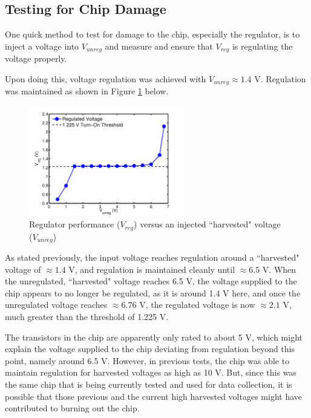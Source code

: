 \documentclass[12pt,onecolumn,titlepage]{article}
\begin{document}
\subsection{Testing for Chip Damage}
\indent \indent One quick method to test for damage to the chip, especially the regulator, is to inject a voltage into $V_{unreg}$ and measure and ensure that $V_{reg}$ is regulating the voltage properly.

Upon doing this, voltage regulation was achieved with $V_{unreg} \approx 1.4$ V. Regulation was maintained as shown in Figure \ref{fig:regulator_damage_test} below.

\begin{figure}[htbp]
	\centering
	\includegraphics[width=0.6\textwidth]{Pictures/21Feb2013/regulator_damage_test}
	\caption{Regulator performance ($V_{reg}$) versus an injected ``harvested" voltage ($V_{unreg}$) }
	\label{fig:regulator_damage_test}
\end{figure}

As stated previously, the input voltage reaches regulation around a ``harvested" voltage of $\approx 1.4$ V, and regulation is maintained cleanly until $\approx 6.5$ V. When the unregulated, ``harvested" voltage reaches 6.5 V, the voltage supplied to the chip appears to no longer be regulated, as it is around 1.4 V here, and once the unregulated voltage reaches $\approx 6.76$ V, the regulated voltage is now $\approx 2.1$ V, much greater than the threshold of 1.225 V. 

The transistors in the chip are apparently only rated to about 5 V, which might explain the voltage supplied to the chip deviating from regulation beyond this point, namely around 6.5 V. However, in previous tests, the chip was able to maintain regulation for harvested voltages as high as 10 V. But, since this was the same chip that is being currently tested and used for data collection, it is possible that those previous and the current high harvested voltages might have contributed to burning out the chip.
\end{document}
